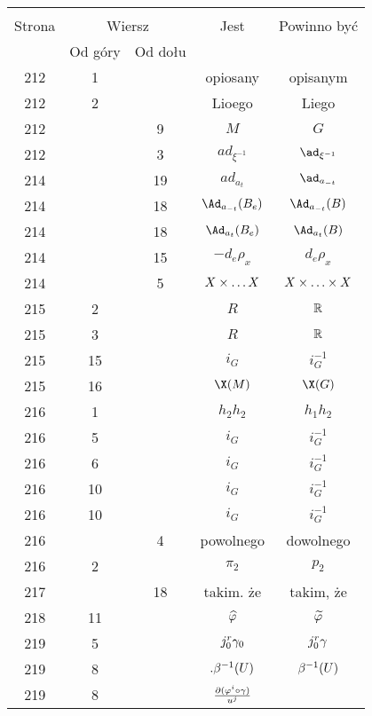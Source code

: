 \documentclass[a4paper,11pt]{article}
\begin{document}
\begin{center}
  \begin{tabular}{|c|c|c|c|c|}
    \hline
    & \multicolumn{2}{c|}{} & & \\
    Strona & \multicolumn{2}{c|}{Wiersz} & Jest
                              & Powinno być \\ \cline{2-3}
    & Od góry & Od dołu & & \\
    \hline
    212 &  1 & & opiosany & opisanym \\
    212 &  2 & & Lioego & Liego \\
    212 & &  9 & $M$ & $G$ \\
    212 & &  3 & $ad_{ \xi^{ -1 } }$ & $\ad_{ \xi^{ -1 } }$ \\
    214 & & 19 & $ad_{ a_{ t } }$ & $\ad_{ a_{ -t } }$ \\
    214 & & 18 & $\Ad_{ a_{ -t } }( B_{ e } )$ & $\Ad_{ a_{ -t } }( B )$ \\
    214 & & 18 & $\Ad_{ a_{ t } }( B_{ e } )$ & $\Ad_{ a_{ t } }( B )$ \\
    214 & & 15 & $-d_{ e }\rho_{ x }$ & $d_{ e }\rho_{ x }$ \\
    214 & &  5 & $X \times \ldots X$ & $X \times \ldots \times X$ \\
    215 &  2 & & $R$ & $\mathbb{R}$ \\
    215 &  3 & & $R$ & $\mathbb{R}$ \\
    215 & 15 & & $i_{ G }$ & $i_{ G }^{ -1 }$ \\
    215 & 16 & & $\X( M )$ & $\X( G )$ \\
    216 &  1 & & $h_{ 2 }h_{ 2 }$ & $h_{ 1 }h_{ 2 }$ \\
    216 &  5 & & $i_{ G }$ & $i^{ -1 }_{ G }$ \\
    216 &  6 & & $i_{ G }$ & $i^{ -1 }_{ G }$ \\
    216 & 10 & & $i_{ G }$ & $i^{ -1 }_{ G }$ \\
    216 & 10 & & $i_{ G }$ & $i^{ -1 }_{ G }$ \\
    216 & &  4 & powolnego & dowolnego \\
    216 &  2 & & $\pi_{ 2 }$ & $p_{ 2 }$ \\
    217 & & 18 & takim. że & takim, że \\
    218 & 11 & & $\widehat{ \varphi }$ & $\widetilde{ \varphi }$ \\
    219 &  5 & & $j^{ r }_{ 0 } \gamma_{ 0 }$ & $j^{ r }_{ 0 } \gamma$ \\
    219 &  8 & & $.\beta^{ -1 }( U )$ & $\beta^{ -1 }( U )$ \\
    219 &  8 & & $\frac{ \partial ( \varphi^{ i } \circ \gamma ) }{ u^{ j } }$

\end{tabular}
\end{center}
\end{document}
